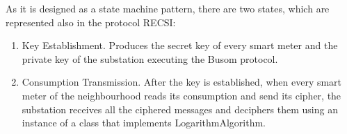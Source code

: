 
As it is designed as a state machine pattern, there are two states, which are represented also in the protocol RECSI:
\begin{enumerate}
	\item Key Establishment. Produces the secret key of every smart meter and the private key of the substation executing the Busom protocol.
	\item Consumption Transmission. After the key is established, when every smart meter of the neighbourhood reads its consumption and send its cipher, the substation receives all the ciphered messages and deciphers them using an instance of a class that implements LogarithmAlgorithm.
\end{enumerate}
